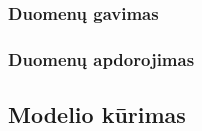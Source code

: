 \documentclass{VUMIFPSkursinis}
\begin{document}
\subsubsection{Duomenų gavimas}

\subsubsection{Duomenų apdorojimas}

\subsection{Modelio kūrimas}



\printbibliography[heading=bibintoc]  %

\end{document}
